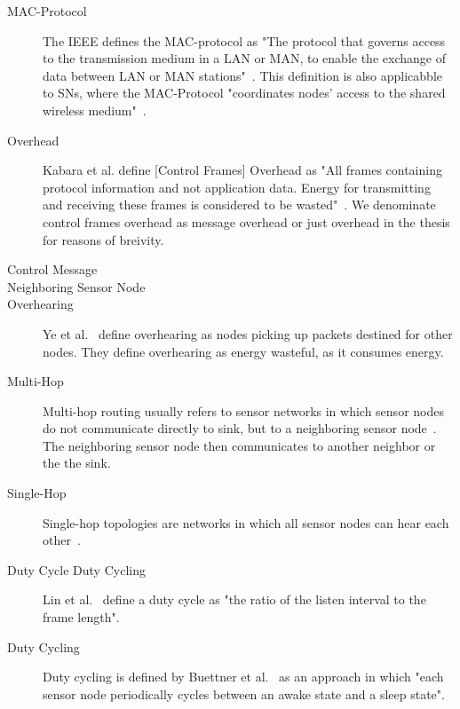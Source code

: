 \begin{description}
    \item[\ac{MAC}-Protocol]
        The \ac{IEEE} defines the \ac{MAC}-protocol as "The protocol that
        governs access to the transmission medium in a \ac{LAN} or \ac{MAN}, to
        enable the exchange of data between \ac{LAN} or \ac{MAN}
        stations"~\cite{ieee802}. This definition is also applicabble to
        \acp{SN}, where the \ac{MAC}-Protocol "coordinates nodes' access to the
        shared wireless medium"~\cite{kredo2007hybrid}.

    \item[Overhead]
        Kabara et al. define [Control Frames] Overhead as "All frames
        containing protocol information and not application data. Energy for
        transmitting and receiving these frames is considered to be
        wasted"~\cite{kabara2012mac}. We denominate control frames overhead as
        message overhead or just overhead in the thesis for reasons of
        breivity.


    \item[Control Message]
        

    \item[Neighboring Sensor Node]
        

    \item[Overhearing]
        Ye et al.~\cite{ye2004medium} define overhearing as nodes picking up
        packets destined for other nodes. They define overhearing as energy
        wasteful, as it consumes energy.

    \item[Multi-Hop]
        Multi-hop routing usually refers to sensor networks in which sensor
        nodes do not communicate directly to sink, but to a neighboring sensor
        node~\cite{yaacoub2012multihop}. The neighboring sensor node then
        communicates to another neighbor or the the sink.

    \item[Single-Hop]
        Single-hop topologies are networks in which all sensor nodes can hear
        each other~\cite{ye2004medium}.

    \item[Duty Cycle Duty Cycling]
        Lin et al.~\cite{lin2004medium} define a duty cycle as "the ratio of
        the listen interval to the frame length". 

    \item[Duty Cycling]
        Duty cycling is defined by Buettner et al.~\cite{buettner2006x} as an
        approach in which "each sensor node periodically cycles between an
        awake state and a sleep state".


\end{description}
